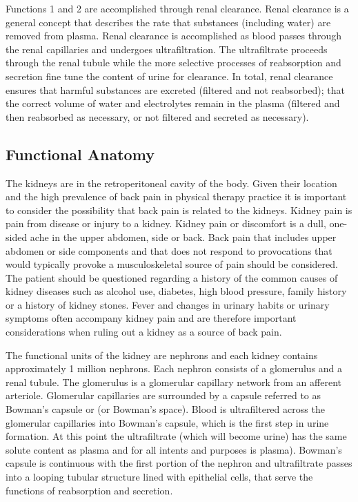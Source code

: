 Functions 1 and 2 are accomplished through renal clearance. Renal clearance is a general concept that describes the rate that substances (including water) are removed from plasma. Renal clearance is accomplished as blood passes through the renal capillaries and undergoes ultrafiltration. The ultrafiltrate proceeds through the renal tubule while the more selective processes of reabsorption and secretion fine tune the content of urine for clearance. In total, renal clearance ensures that harmful substances are excreted (filtered and not reabsorbed); that the correct volume of water and electrolytes remain in the plasma (filtered and then reabsorbed as necessary, or not filtered and secreted as necessary). 

\subsection{Functional Anatomy}

The kidneys are in the retroperitoneal cavity of the body.  Given their location and the high prevalence of back pain in physical therapy practice it is important to consider the possibility that back pain is related to the kidneys. Kidney pain is pain from disease or injury to a kidney. Kidney pain or discomfort is a dull, one-sided ache in the upper abdomen, side or back. Back pain that includes upper abdomen or side components and that does not respond to provocations that would typically provoke a musculoskeletal source of pain should be considered. The patient should be questioned regarding a history of the common causes of kidney diseases such as alcohol use, diabetes, high blood pressure, family history or a history of kidney stones. Fever and changes in urinary habits or urinary symptoms often accompany kidney pain and are therefore important considerations when ruling out a kidney as a source of back pain.

The functional units of the kidney are nephrons and each kidney contains approximately 1 million nephrons. Each nephron consists of a glomerulus and a renal tubule. The glomerulus is a glomerular capillary network from an afferent arteriole. Glomerular capillaries are surrounded by a capsule referred to as Bowman’s capsule or (or Bowman’s space).  Blood is ultrafiltered across the glomerular capillaries into Bowman’s capsule, which is the first step in urine formation. At this point the ultrafiltrate (which will become urine) has the same solute content as plasma and for all intents and purposes is plasma). Bowman’s capsule is continuous with the first portion of the nephron and ultrafiltrate passes into a looping tubular structure lined with epithelial cells, that serve the functions of reabsorption and secretion. 

